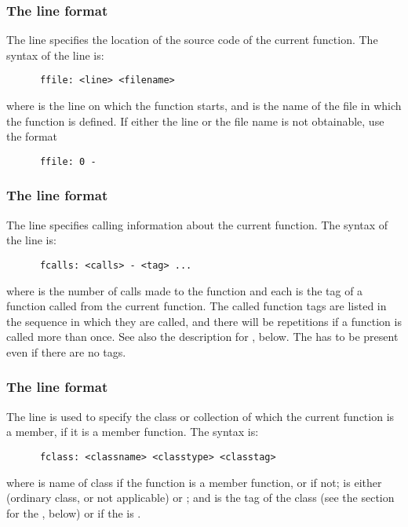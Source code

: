 \subsubsection{The  line format}

The  line specifies the location of the source code of the 
current function. The syntax of the  line is:
\begin{verbatim}
      ffile: <line> <filename>
\end{verbatim}
\noindent
where  is the line on which the function starts, and
 is the name of the file in which the function is defined.
If either the line or the file name is not obtainable, use the format
\begin{verbatim}
      ffile: 0 -
\end{verbatim}

\subsubsection{The  line format}

The  line specifies calling information about the current 
function. The syntax of the  line is:
\begin{verbatim}
      fcalls: <calls> - <tag> ...
\end{verbatim}
\noindent
where  is the number of calls made to the function and
each  is the tag of a function called from the current
function. The called function tags are listed in the sequence in which they
are called, and there will be repetitions if a function is called more
than once. See also the description for , below. The \code{-}
has to be present even if there are no tags.

\subsubsection{The  line format}

The  line is used to specify the class or collection of which
the current function is a member, if it is a member function. The syntax
is:
\begin{verbatim}
      fclass: <classname> <classtype> <classtag>
\end{verbatim}
\noindent
where  is name of class if the function is a member
function, or \code{-} if not;  is either \code{-}
(ordinary class, or not applicable) or ; and 
is the tag of the class (see the section for the , below)
or  if the  is \code{-}.

